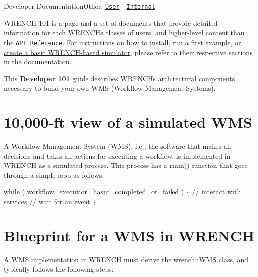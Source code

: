 Developer DocumentationOther\+: \href{../user/wrench-101.html}{\tt User} -\/ \href{../internal/wrench-101.html}{\tt Internal}

W\+R\+E\+N\+CH 101 is a page and a set of documents that provide detailed information for each W\+R\+E\+N\+CH\textquotesingle{}s \hyperlink{index_overview-users}{classes of users}, and higher-\/level content than the \href{./annotated.html}{\tt A\+PI Reference}. For instructions on how to \hyperlink{install}{install}, run a \hyperlink{getting-started}{first example}, or \hyperlink{getting-started_getting-started-prep}{create a basic W\+R\+E\+N\+C\+H-\/based simulator}, please refer to their respective sections in the documentation.

This {\bfseries Developer 101} guide describes W\+R\+E\+N\+CH\textquotesingle{}s architectural components necessary to build your own W\+MS (Workflow Management Systems). 

\hypertarget{wrench-101_wrench-101-WMS-10000ft}{}\section{10,000-\/ft view of a simulated W\+MS}\label{wrench-101_wrench-101-WMS-10000ft}
A Workflow Management System (W\+MS), i.\+e., the software that makes all decisions and takes all actions for executing a workflow, is implemented in W\+R\+E\+N\+CH as a simulated process. This process has a {\ttfamily main()} function that goes through a simple loop as follows\+:


\begin{DoxyCode}
\textcolor{keywordflow}{while} ( workflow\_execution\_hasnt\_completed\_or\_failed ) \{
  \textcolor{comment}{// interact with services}
  \textcolor{comment}{// wait for an event}
\}
\end{DoxyCode}
\hypertarget{wrench-101_wrench-101-WMS-blueprint}{}\section{Blueprint for a W\+M\+S in W\+R\+E\+N\+CH}\label{wrench-101_wrench-101-WMS-blueprint}
A W\+MS implementation in W\+R\+E\+N\+CH must derive the {\ttfamily \hyperlink{classwrench_1_1_w_m_s}{wrench\+::\+W\+MS}} class, and typically follows the following steps\+:


